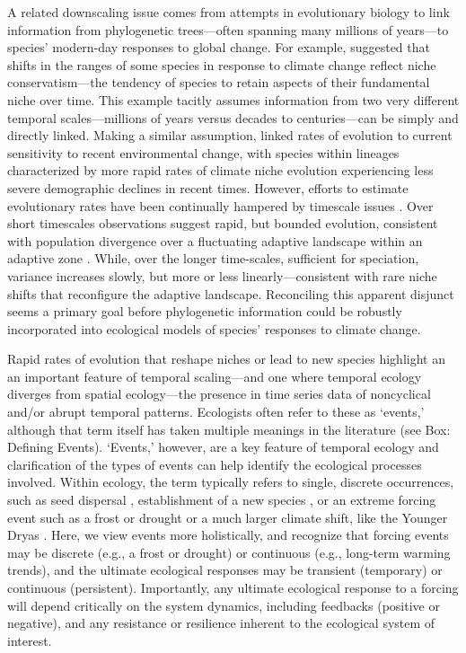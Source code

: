 \documentclass[11pt,a4paper,oneside]{article}
\begin{document}
A related downscaling issue comes from attempts in evolutionary biology to link information from phylogenetic trees---often spanning many millions of years---to species' modern-day responses to global change. For example, \citet{Wiens2005} suggested that shifts in the ranges of some species in
response to climate change reflect niche conservatism---the tendency of
species to retain aspects of their fundamental niche over time. This example
tacitly assumes information from two very different temporal 
scales---millions of years versus decades to centuries---can be
simply and directly linked. Making a similar assumption, \citet{lavergne2013} linked
rates of evolution to current sensitivity to recent environmental
change, with species within lineages characterized by more rapid rates of climate
niche evolution experiencing less severe demographic declines in recent times. However, efforts to
estimate evolutionary rates have been continually hampered by timescale issues
\citep{schoener2011,Uyeda2011}. Over short timescales observations
suggest rapid, but bounded evolution, consistent with population
divergence over a fluctuating adaptive landscape within an adaptive zone
\citep{Uyeda2011}. While, over the longer time-scales, sufficient for
speciation, variance increases slowly, but more or less
linearly---consistent with rare niche shifts that reconfigure the
adaptive landscape. Reconciling this apparent disjunct seems a primary
goal before phylogenetic information could be robustly incorporated into
ecological models of species' responses to climate change.

Rapid rates of evolution that reshape niches or lead to new species highlight an an important feature of temporal scaling---and one where temporal ecology diverges from spatial ecology---the presence in time series data of noncyclical and/or abrupt temporal patterns. Ecologists often refer to these as `events,' although that term itself has taken multiple meanings in the literature (see Box: Defining Events). `Events,' however, are a key feature of temporal ecology and clarification of the types of events can help identify the ecological processes involved. Within ecology, the term typically refers to single, discrete occurrences, such as seed dispersal \citep{Higgins2003}, establishment of a new species \citep{Blackburn2011}, or an extreme forcing event such as a frost or drought \citep{Jentsch:2009ff} or a much larger climate shift, like the Younger Dryas \citep{Jackson:2009el}. Here, we view events more holistically, and recognize that forcing events may be discrete (e.g., a frost or drought) or continuous (e.g., long-term warming trends), and the ultimate ecological responses may be transient (temporary) or continuous (persistent). Importantly, any ultimate ecological response to a forcing will depend critically on the system dynamics, including feedbacks (positive or negative), and any resistance or resilience inherent to the ecological system of interest. 
\end{document}
